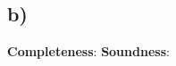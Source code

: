 \documentclass[unicode,11pt,a4paper,oneside,numbers=endperiod,openany]{scrartcl}
\begin{document}
\subsection*{b)}


\textbf{Completeness}:
\textbf{Soundness}:
\end{document}
